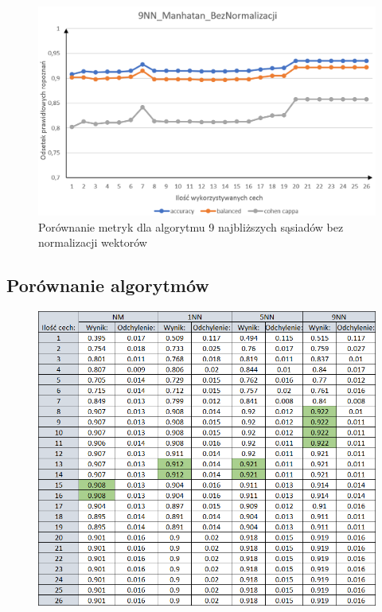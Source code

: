 \documentclass[12pt]{article}
\begin{document}
\begin{figure}[H]
	\centering
		\includegraphics[scale=0.66]{images/metrics/9nn_manhatan_beznorm.png}
	\caption{Porównanie metryk dla algorytmu 9 najbliższych sąsiadów bez normalizacji wektorów}
\end{figure}
\subsection{Porównanie algorytmów}

\begin{figure}[H]
	\centering
		\includegraphics[scale=0.8]{images/algorithms/euklides_norm_tab.png}
	
\end{figure}
\end{document}
